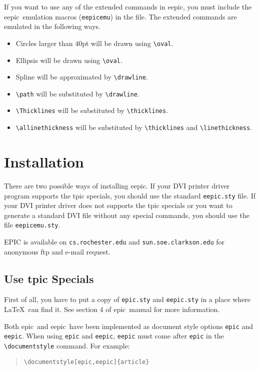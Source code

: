 \documentclass[11pt]{article}
\newcommand{\epic}{{\sc epic}}
\newcommand{\eepic}{{\sc eepic}}
\begin{document}
If you want to use any of the extended commands in \eepic, you
must include the \eepic\ emulation macros (\verb|eepicemu|) in
the file. The extended commands are emulated in the following
ways.
\begin{itemize}
\item Circles larger than 40pt will be drawn using \verb|\oval|.
\item Ellipsis will be drawn using \verb|\oval|.
\item Spline will be approximated by \verb|\drawline|.
\item \verb|\path| will be substituted by \verb|\drawline|.
\item \verb|\Thicklines| will be substituted by
\verb|\thicklines|.
\item \verb|\allinethickness| will be substituted by
\verb|\thicklines| and \verb|\linethickness|.
\end{itemize}

\clearpage


\section{Installation}
There are two possible ways of installing \eepic. If your DVI
printer driver program supports the tpic specials, you should use
the standard \verb|eepic.sty| file. If your DVI printer driver
does not supports the tpic specials or you want to generate a
standard DVI file without any special commands, you should use
the file \verb|eepicemu.sty|.

EPIC is available on \verb|cs.rochester.edu| and
\verb|sun.soe.clarkson.edu| for anonymous ftp and e-mail request.

\subsection{Use tpic Specials}
First of all, you have to put a copy of \verb|epic.sty| and
\verb|eepic.sty| in a place where \LaTeX\ can find it. See
section 4 of \epic\ manual for more information.

Both \epic\ and \eepic\ have been implemented as document style
options \verb|epic| and \verb|eepic|. When using
\verb|epic| and \verb|eepic|, \verb|eepic| must come
after \verb|epic| in the \verb|\documentstyle| command. For example:
\begin{quote}
\begin{verbatim}
\documentstyle[epic,eepic]{article}
\end{verbatim}
\end{quote}
\end{document}
